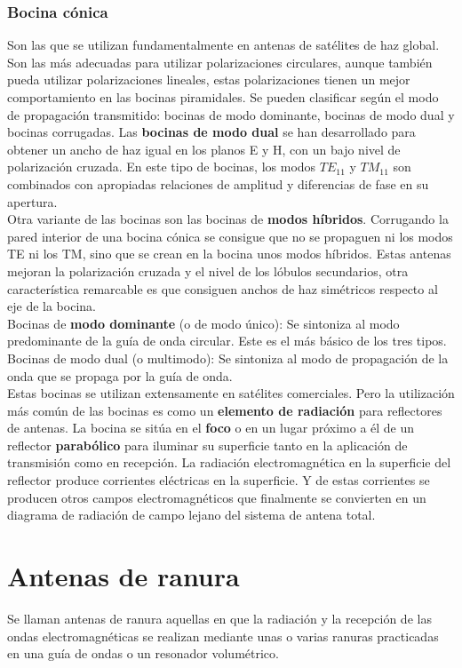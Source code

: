 \documentclass[
	12pt, %
	fleqn, %
	a4paper, %
	oneside, %
]{LegrandOrangeBook}
\begin{document}
\subsubsection{Bocina cónica}
Son las que se utilizan fundamentalmente en antenas de satélites de haz global. Son las más adecuadas para utilizar polarizaciones circulares, aunque también pueda utilizar polarizaciones lineales, estas polarizaciones tienen un mejor comportamiento en las bocinas piramidales. Se pueden clasificar según el modo de propagación transmitido: bocinas de modo dominante, bocinas de modo dual y bocinas corrugadas. 
Las \textbf{bocinas de modo dual} se han desarrollado para obtener un ancho de haz igual en los planos E y H, con un bajo nivel de polarización cruzada. En este tipo de bocinas, los modos $TE_{11}$ y $TM_{11}$ son combinados con apropiadas relaciones de amplitud y diferencias de fase en su apertura.\\
Otra variante de las bocinas son las bocinas de \textbf{modos híbridos}. Corrugando la pared interior de una bocina cónica se consigue que no se propaguen ni los modos TE ni los TM, sino que se crean en la bocina unos modos híbridos. Estas antenas mejoran la polarización cruzada y el nivel de los lóbulos secundarios, otra característica remarcable es que consiguen anchos de haz simétricos respecto al eje de la bocina.\\
Bocinas de \textbf{modo dominante} (o de modo único): Se sintoniza al modo predominante de la guía de onda circular. Este es el más básico de los tres tipos.
Bocinas de modo dual (o multimodo): Se sintoniza al modo  de propagación de la onda que se propaga por la guía de onda.\\
Estas bocinas se utilizan extensamente en satélites comerciales. Pero la utilización más común de las bocinas es como un \textbf{elemento de radiación} para reflectores de antenas. La bocina se sitúa en el \textbf{foco} o en un lugar próximo a él de un reflector \textbf{parabólico} para iluminar su superficie tanto en la aplicación de transmisión como en recepción. La radiación electromagnética en la superficie del reflector produce corrientes eléctricas en la superficie. Y de estas corrientes se producen otros campos electromagnéticos que finalmente se convierten en un diagrama de radiación de campo lejano del sistema de antena total.
\section{Antenas de ranura}
Se llaman antenas de ranura aquellas en que la radiación y la recepción de las ondas electromagnéticas se realizan mediante unas o varias ranuras practicadas en una guía de ondas o un resonador volumétrico.
\end{document}
